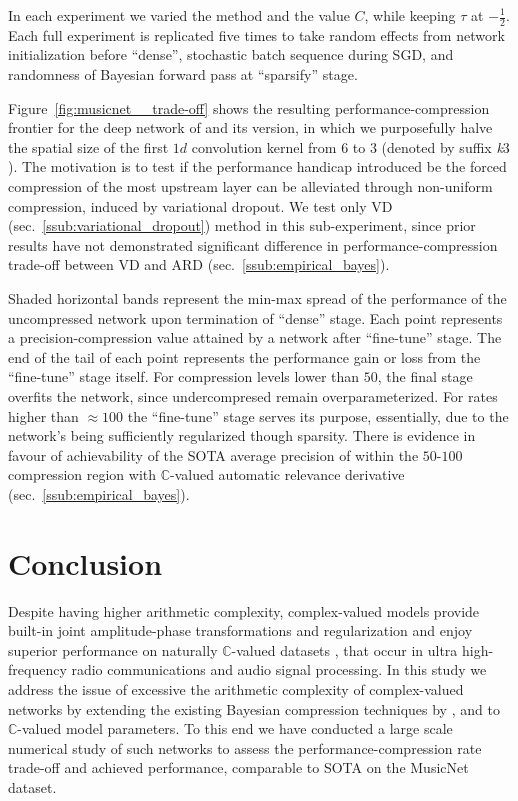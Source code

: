\documentclass[a4paper,10pt]{article}
\newcommand{\cplx}{\mathbb{C}}
\begin{document}
In each experiment we varied the method and the value $C$, while keeping $\tau$ at $-\tfrac12$.
Each full experiment is replicated five times to take random effects from network initialization
before ``dense'', stochastic batch sequence during SGD, and randomness of Bayesian forward
pass at ``sparsify'' stage.

Figure~\ref{fig:musicnet__trade-off} shows the resulting performance-compression frontier
for the deep network of \citet{trabelsi_deep_2017} and its version, in which we purposefully
halve the spatial size of the first $1d$ convolution kernel from $6$ to $3$ (denoted by
suffix \textit{k}$3$). The motivation is to test if the performance handicap introduced be
the forced compression of the most upstream layer can be alleviated through non-uniform
compression, induced by variational dropout. We test only VD (sec.~\ref{ssub:variational_dropout})
method in this sub-experiment, since prior results have not demonstrated significant difference
in performance-compression trade-off between VD and ARD (sec.~\ref{ssub:empirical_bayes}).

Shaded horizontal bands represent the min-max spread of the performance of the uncompressed
network upon termination of ``dense'' stage. Each point represents a precision-compression
value attained by a network after ``fine-tune'' stage. The end of the tail of each point
represents the performance gain or loss from the ``fine-tune'' stage itself.
%
For compression levels lower than $50$, the final stage overfits the network, since
undercompresed remain overparameterized. For rates higher than $\approx 100$ the ``fine-tune''
stage serves its purpose, essentially, due to the network's being sufficiently regularized
though sparsity. There is evidence in favour of achievability of the SOTA average precision
of \citet{trabelsi_deep_2017} within the $50$-$100$ compression region with $\cplx$-valued
automatic relevance derivative (sec.~\ref{ssub:empirical_bayes}).




\section{Conclusion} %
\label{sec:conclusion}

Despite having higher arithmetic complexity, complex-valued models provide built-in
joint amplitude-phase transformations and regularization \citep{hirose_complex-valued_2009}
and enjoy superior performance on naturally $\cplx$-valued datasets \citep{tarver_design_2019},
that occur in ultra high-frequency radio communications and audio signal processing. In this
study we address the issue of excessive the arithmetic complexity of complex-valued networks
by extending the existing Bayesian compression techniques by \citet{kingma_variational_2015},
\citet{molchanov_variational_2017} and \citet{kharitonov_variational_2018} to $\cplx$-valued
model parameters. To this end we have conducted a large scale numerical study of such networks
to assess the performance-compression rate trade-off and achieved performance, comparable
to SOTA on the MusicNet dataset.
\end{document}
